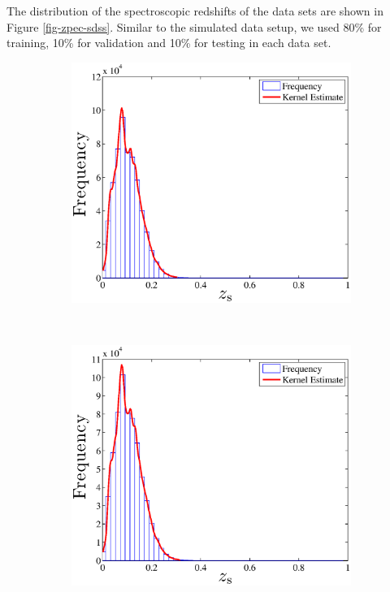 \documentclass[useAMS,usenatbib,fleqn]{mn2e}
\begin{document}
The distribution of the spectroscopic redshifts of the data sets are shown in Figure \ref{fig-zpec-sdss}. Similar to the simulated data setup, we used 80\% for training, 10\% for validation and 10\% for testing in each data set.

\begin{figure}
        \centering
        \begin{subfigure}[b]{0.45\textwidth}
                \includegraphics[width=\textwidth]{figures/zspec_sdss_cut.eps}
        \end{subfigure}
        ~
        \begin{subfigure}[b]{0.45\textwidth}
                \includegraphics[width=\textwidth]{figures/zspec_boss_cut.eps}
        \end{subfigure}


\end{figure}
\end{document}

